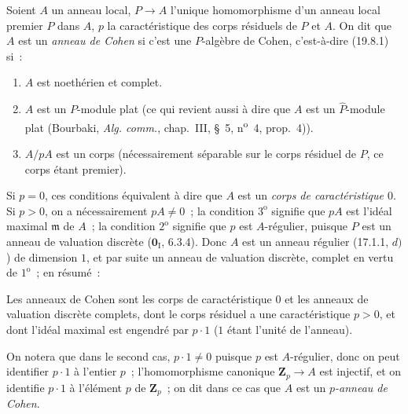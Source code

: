 
\begin{definition}[19.8.4]
\label{0.19.8.4-fr}
Soient $A$ un anneau local, $P\to A$ l'unique homomorphisme d'un anneau local
premier $P$ dans $A$, $p$ la caractéristique des corps résiduels de $P$ et
$A$. On dit que $A$ est un \emph{anneau de Cohen} si c'est une $P$-algèbre de
Cohen, c'est-à-dire (19.8.1) si~:
\begin{enumerate}
  \item[$1^{\mathrm o}$] $A$ est noethérien et complet.
  \item[$2^{\mathrm o}$] $A$ est un $P$-module plat (ce qui revient aussi à
  dire que $A$ est un $\widehat P$-module plat (Bourbaki, \emph{Alg. comm.},
  chap.~III, §~5, n\textsuperscript{o}~4, prop.~4)).
  \item[$3^{\mathrm o}$] $A/pA$ est un corps (nécessairement séparable sur le
  corps résiduel de $P$, ce corps étant premier).
\end{enumerate}
\end{definition}

Si $p=0$, ces conditions équivalent à dire que $A$ est un \emph{corps de
caractéristique $0$}. Si $p>0$, on a nécessairement $pA\neq0$~; la condition
$3^{\mathrm o}$ signifie que $pA$ est l'idéal maximal $\mathfrak m$ de $A$~;
la condition $2^{\mathrm o}$ signifie que $p$ est $A$-régulier, puisque $P$
est un anneau de valuation discrète ($\mathbf 0_{\mathrm I}$, 6.3.4). Donc $A$
est un anneau régulier (17.1.1, $d)$) de dimension $1$, et par suite un anneau
de valuation discrète, complet en vertu de $1^{\mathrm o}$~; en résumé~:

\begin{proposition}[19.8.5]
\label{0.19.8.5-fr}
Les anneaux de Cohen sont les corps de caractéristique $0$ et les anneaux de
valuation discrète complets, dont le corps résiduel a une caractéristique
$p>0$, et dont l'idéal maximal est engendré par $p\cdot1$ ($1$ étant l'unité de
l'anneau).
\end{proposition}

On notera que dans le second cas, $p\cdot1\neq0$ puisque $p$ est $A$-régulier,
donc on peut identifier $p\cdot1$ à l'entier $p$~; l'homomorphisme canonique
$\mathbf Z_p\to A$ est injectif, et on identifie $p\cdot1$ à l'élément $p$ de
$\mathbf Z_p$~; on dit dans ce cas que $A$ est un \emph{$p$-anneau de Cohen}.

